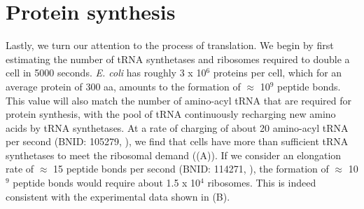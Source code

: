 \section{Protein synthesis}

Lastly, we turn our attention to the process of translation.  We begin by first
estimating the number of tRNA synthetases and ribosomes required to  double a
cell in 5000 seconds.  \textit{E. coli} has roughly 3 x 10$^6$ proteins per
cell, which for an average protein of 300 aa, amounts to the formation of
$\approx$ 10$^9$ peptide bonds. This value will also match the number of
amino-acyl tRNA that are required for protein synthesis, with the pool of tRNA continuously
recharging new amino acids by tRNA synthetases. At a rate of charging of about
20 amino-acyl tRNA per second (BNID: 105279, \cite{milo2010}), we find that
cells have more than sufficient tRNA synthetases to meet the ribosomal demand
((A)). If we consider an elongation rate of $\approx$ 15
peptide bonds per second (BNID: 114271, \cite{milo2010, dai2016}), the formation
of $\approx$ 10$^9$ peptide bonds would require about 1.5 x 10$^4$ ribosomes.
This is indeed consistent with the experimental data shown in
(B).

\begin{figure}
    \begin{fullwidth}
    \end{fullwidth}
\end{figure}

